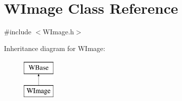 \hypertarget{class_w_image}{}\section{W\+Image Class Reference}
\label{class_w_image}


{\ttfamily \#include $<$W\+Image.\+h$>$}

Inheritance diagram for W\+Image\+:\begin{figure}[H]
\begin{center}
\leavevmode
\includegraphics[height=2.000000cm]{class_w_image}
\end{center}
\end{figure}
